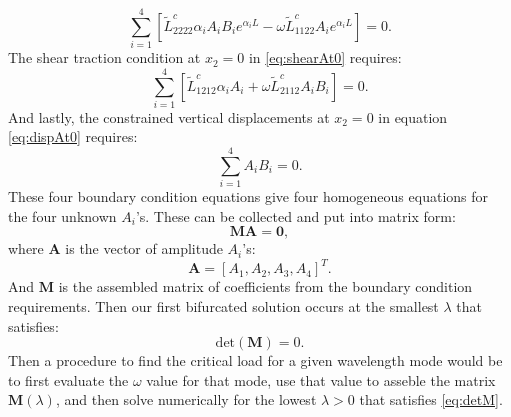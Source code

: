 \documentclass[11pt]{report}
\begin{document}
\begin{appendices}
\begin{equation}
\sum_{i = 1}^4 \left [ \tilde{L}^{c}_{2222} \alpha_i A_i B_i e^{\alpha_i L} - \omega \tilde{L}^{c}_{1122} A_i e^{\alpha_i L} \right ] = 0 .
\end{equation}
The shear traction condition at $x_2 = 0$ in \eqref{eq:shearAt0} requires:
\begin{equation}
\sum_{i = 1}^4 \left [ \tilde{L}^{c}_{1212} \alpha_iA_i + \omega \tilde{L}^{c}_{2112} A_i B_i \right ] = 0.
\end{equation}
And lastly, the constrained vertical displacements at $x_2 = 0$ in equation \eqref{eq:dispAt0} requires:
\begin{equation}
\sum_{i=1}^4 A_i B_i = 0.
\end{equation}
These four boundary condition equations give four homogeneous equations for the four unknown $A_i$'s. These can be collected and put into matrix form:
\begin{equation}
\mathbf{M} \mathbf{A} = \mathbf{0},
\end{equation}
where $\mathbf{A}$ is the vector of amplitude $A_i$'s:
\begin{equation}
\mathbf{A} = [ A_1, A_2, A_3, A_4 ]^T.
\end{equation}
And $\mathbf{M}$ is the assembled matrix of coefficients from the boundary condition requirements. Then our first bifurcated solution occurs at the smallest $\lambda$ that satisfies:
\begin{equation} \label{eq:detM}
\mathrm{det}(\mathbf{M}) = 0.
\end{equation}
Then a procedure to find the critical load for a given wavelength mode would be to first evaluate the $\omega$ value for that mode, use that value to asseble the matrix $\mathbf{M}(\lambda)$, and then solve numerically for the lowest $\lambda > 0$ that satisfies \eqref{eq:detM}.


\end{appendices}
\end{document}
